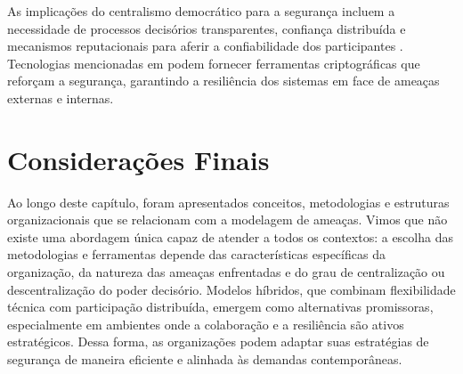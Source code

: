As implicações do centralismo democrático para a segurança
incluem a necessidade de processos decisórios transparentes,
confiança distribuída e mecanismos reputacionais para aferir
a confiabilidade dos participantes
\cite{Reputation-basedDAO}. Tecnologias mencionadas em
\cite{AbcCrypto} podem fornecer ferramentas criptográficas
que reforçam a segurança, garantindo a resiliência dos
sistemas em face de ameaças externas e internas.

\section*{Considerações Finais}

Ao longo deste capítulo, foram apresentados conceitos,
metodologias e estruturas organizacionais que se relacionam
com a modelagem de ameaças. Vimos que não existe uma
abordagem única capaz de atender a todos os contextos: a
escolha das metodologias e ferramentas depende das
características específicas da organização, da natureza das
ameaças enfrentadas e do grau de centralização ou
descentralização do poder decisório. Modelos híbridos, que
combinam flexibilidade técnica com participação distribuída,
emergem como alternativas promissoras, especialmente em
ambientes onde a colaboração e a resiliência são ativos
estratégicos. Dessa forma, as organizações podem adaptar
suas estratégias de segurança de maneira eficiente e
alinhada às demandas contemporâneas.